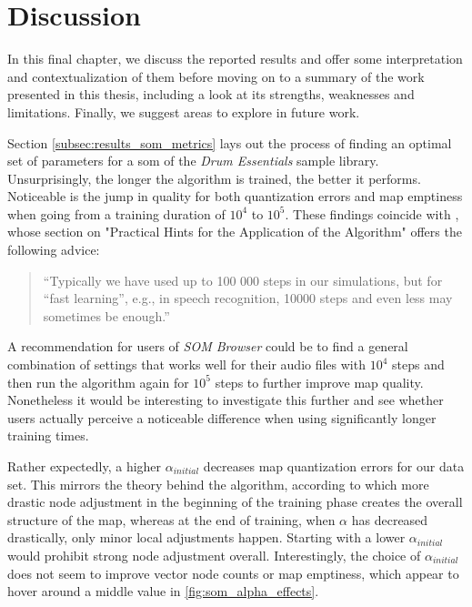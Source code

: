 
\section{Discussion}
\label{sec:discussion}
In this final chapter, we discuss the reported results and offer some
interpretation and contextualization of them before moving on to a summary of
the work presented in this thesis, including a look at its strengths, weaknesses
and limitations. Finally, we suggest areas to explore in future work.

\smallskip

Section \ref{subsec:results_som_metrics} lays out the process of finding an
optimal set of parameters for a \gls{som} of the \textit{Drum Essentials} sample
library. Unsurprisingly, the longer the algorithm is trained, the better it
performs. Noticeable is the jump in quality for both quantization errors and
map emptiness when going from a training duration of $10^4$ to $10^5$. These
findings coincide with \citet{kohonen1990}, whose section on "Practical Hints
for the Application of the Algorithm" offers the following advice:

\begin{quotation}
“Typically we have used up to 100 000 steps in our simulations, but for
“fast learning”, e.g., in speech recognition, 10000 steps and even less may
sometimes be enough.”
\end{quotation}

A recommendation for users of \textit{SOM Browser} could be to find a general
combination of settings that works well for their audio files with $10^4$ steps
and then run the algorithm again for $10^5$ steps to further improve map
quality. Nonetheless it would be interesting to investigate this further and
see whether users actually perceive a noticeable difference when using
significantly longer training times.

\smallskip

Rather expectedly, a higher $\alpha_{initial}$ decreases map quantization errors
for our data set. This mirrors the theory behind the algorithm, according to
which more drastic node adjustment in the beginning of the training phase
creates the overall structure of the map, whereas at the end of training, when
$\alpha$ has decreased drastically, only minor local adjustments happen.
Starting with a lower $\alpha_{initial}$ would prohibit strong node adjustment
overall. Interestingly, the choice of $\alpha_{initial}$ does not seem to
improve vector node counts or map emptiness, which appear to hover around a
middle value in \ref{fig:som_alpha_effects}.

